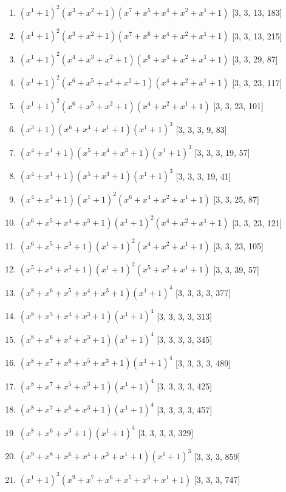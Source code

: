 \documentclass[10pt,twocolumn]{article}
\begin{document}
\begin{enumerate}
\item $(x^{1} + 1)^{2}(x^{3} + x^{2} + 1)(x^{7} + x^{5} + x^{4} + x^{2} + x^{1} + 1)$  [3, 3, 13, 183]
\item $(x^{1} + 1)^{2}(x^{3} + x^{2} + 1)(x^{7} + x^{6} + x^{4} + x^{2} + x^{1} + 1)$  [3, 3, 13, 215]
\item $(x^{1} + 1)^{2}(x^{4} + x^{3} + x^{2} + 1)(x^{6} + x^{4} + x^{2} + x^{1} + 1)$  [3, 3, 29, 87]
\item $(x^{1} + 1)^{2}(x^{6} + x^{5} + x^{4} + x^{2} + 1)(x^{4} + x^{2} + x^{1} + 1)$  [3, 3, 23, 117]
\item $(x^{1} + 1)^{2}(x^{6} + x^{5} + x^{2} + 1)(x^{4} + x^{2} + x^{1} + 1)$  [3, 3, 23, 101]
\item $(x^{3} + 1)(x^{6} + x^{4} + x^{1} + 1)(x^{1} + 1)^{3}$  [3, 3, 3, 9, 83]
\item $(x^{4} + x^{1} + 1)(x^{5} + x^{4} + x^{3} + 1)(x^{1} + 1)^{3}$  [3, 3, 3, 19, 57]
\item $(x^{4} + x^{1} + 1)(x^{5} + x^{3} + 1)(x^{1} + 1)^{3}$  [3, 3, 3, 19, 41]
\item $(x^{4} + x^{3} + 1)(x^{1} + 1)^{2}(x^{6} + x^{4} + x^{2} + x^{1} + 1)$  [3, 3, 25, 87]
\item $(x^{6} + x^{5} + x^{4} + x^{3} + 1)(x^{1} + 1)^{2}(x^{4} + x^{2} + x^{1} + 1)$  [3, 3, 23, 121]
\item $(x^{6} + x^{5} + x^{3} + 1)(x^{1} + 1)^{2}(x^{4} + x^{2} + x^{1} + 1)$  [3, 3, 23, 105]
\item $(x^{5} + x^{4} + x^{3} + 1)(x^{1} + 1)^{2}(x^{5} + x^{2} + x^{1} + 1)$  [3, 3, 39, 57]
\item $(x^{8} + x^{6} + x^{5} + x^{4} + x^{3} + 1)(x^{1} + 1)^{4}$  [3, 3, 3, 3, 377]
\item $(x^{8} + x^{5} + x^{4} + x^{3} + 1)(x^{1} + 1)^{4}$  [3, 3, 3, 3, 313]
\item $(x^{8} + x^{6} + x^{4} + x^{3} + 1)(x^{1} + 1)^{4}$  [3, 3, 3, 3, 345]
\item $(x^{8} + x^{7} + x^{6} + x^{5} + x^{3} + 1)(x^{1} + 1)^{4}$  [3, 3, 3, 3, 489]
\item $(x^{8} + x^{7} + x^{5} + x^{3} + 1)(x^{1} + 1)^{4}$  [3, 3, 3, 3, 425]
\item $(x^{8} + x^{7} + x^{6} + x^{3} + 1)(x^{1} + 1)^{4}$  [3, 3, 3, 3, 457]
\item $(x^{8} + x^{6} + x^{3} + 1)(x^{1} + 1)^{4}$  [3, 3, 3, 3, 329]
\item $(x^{9} + x^{8} + x^{6} + x^{4} + x^{3} + x^{1} + 1)(x^{1} + 1)^{3}$  [3, 3, 3, 859]
\item $(x^{1} + 1)^{3}(x^{9} + x^{7} + x^{6} + x^{5} + x^{3} + x^{1} + 1)$  [3, 3, 3, 747]

\end{enumerate}
\end{document}
